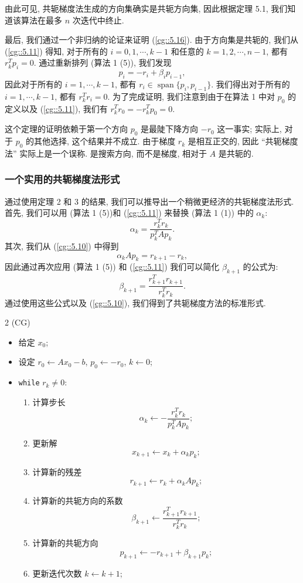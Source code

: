\documentclass[a4paper]{ctexart}
\newcommand{\hl}[1]
{\noindent {\bf {#1}}}
\begin{document}
{由此可见, 共轭梯度法生成的方向集确实是共轭方向集, 
因此根据定理 5.1, 我们知道该算法在最多 $n$ 次迭代中终止.

最后, 我们通过一个非归纳的论证来证明 (\ref{cg::5.16}). 
由于方向集是共轭的, 我们从 (\ref{cg::5.11}) 得知, 
对于所有的 $i = 0, 1, \cdots, k - 1$ 和任意的 
$k = 1, 2, \cdots, n - 1$, 都有 $r_k^T p_i = 0$. 
通过重新排列 (算法 1 (5)), 我们发现
$$
p_i = -r_i + \beta_i p_{i-1},
$$
因此对于所有的 $i = 1, \cdots, k - 1$, 
都有 $r_i \in \operatorname{span}\{p_i, p_{i-1}\}$. 
我们得出对于所有的 $i = 1, \cdots, k - 1$, 
都有 $r_k^T r_i = 0$. 为了完成证明, 我们注意到由于在算法 1 中对 
$p_0$ 的定义以及 (\ref{cg::5.11}), 
我们有 $r_k^T r_0 = -r_k^T p_0 = 0$.

这个定理的证明依赖于第一个方向 $p_0$ 是最陡下降方向 $-r_0$ 这一事实; 
实际上, 对于 $p_0$ 的其他选择, 这个结果并不成立. 由于梯度 $r_k$ 是相互正交的, 
因此 ``共轭梯度法'' 实际上是一个误称. 是搜索方向, 而不是梯度, 相对于 $A$ 是共轭的.

\subsubsection*{一个实用的共轭梯度法形式}

通过使用定理 2 和 3 的结果, 我们可以推导出一个稍微更经济的共轭梯度法形式. 
首先, 我们可以用 (算法 1 (5))和 (\ref{cg::5.11}) 
来替换 (算法 1 (1)) 中的 $\alpha_k$:
$$
\alpha_k = \frac{r_k^T r_k}{p_k^T A p_k}.
$$
其次, 我们从 (\ref{cg::5.10}) 中得到 
$$
\alpha_k A p_k = r_{k+1} - r_k,
$$ 
因此通过再次应用 (算法 1 (5)) 和 (\ref{cg::5.11}) 
我们可以简化 $\beta_{k+1}$ 的公式为:
$$
\beta_{k+1} = \frac{r_{k+1}^T r_{k+1}}{r_k^T r_k}.
$$
通过使用这些公式以及 (\ref{cg::5.10}), 我们得到了共轭梯度方法的标准形式.

\hl{算法} 2 (CG)

\begin{itemize}
  \item 给定 $x_0$;
  \item 设定 $r_0 \leftarrow Ax_0 - b$, 
  $p_0 \leftarrow -r_0$, $k \leftarrow 0$;
  \item \verb|while| $r_k \neq 0$:
  \begin{enumerate}
  \item 计算步长 
  $$
  \alpha_k \leftarrow - \frac{r_k^T r_k}{p_k^T A p_k};
  $$
  \item 更新解
  $$ 
  x_{k + 1} \leftarrow x_k + \alpha_k p_k; 
  $$
  \item 计算新的残差
  $$
  r_{k + 1} \leftarrow r_{k} + \alpha_k A p_{k};
  $$
  \item 计算新的共轭方向的系数
  $$
  \beta_{k + 1} \leftarrow \frac{r_{k + 1}^T r_{k + 1}}{r_k^T r_k};
  $$
  \item 计算新的共轭方向
  $$
  p_{k+1} \leftarrow -r_{k + 1} + \beta_{k + 1} p_k;
  $$
  \item 更新迭代次数 $k \leftarrow k + 1$;
  \end{enumerate}
\end{itemize}

}
\end{document}
